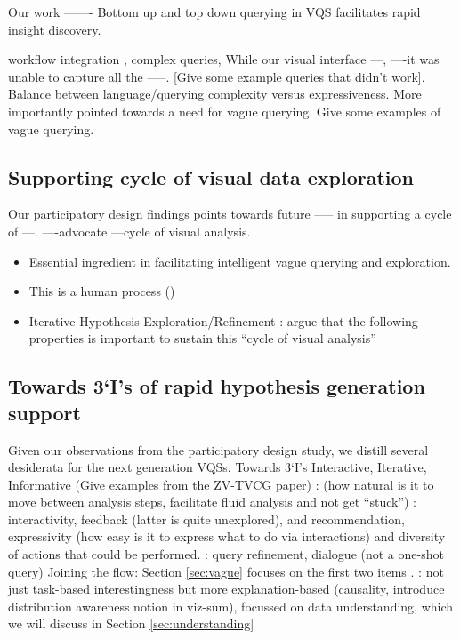 \par Our \zv work ------- Bottom up and top down querying in VQS facilitates rapid insight discovery. 

workflow integration , complex queries,
While our visual interface ---, ----it was unable to capture all the -----. [Give some example queries that didn't work]. Balance between language/querying complexity versus expressiveness. More importantly pointed towards a need for vague querying. Give some examples of vague querying.

\subsection{Supporting cycle of visual data exploration}
Our participatory design findings points towards future ----- in supporting a cycle of ---.  ----advocate ---cycle of visual analysis. 
\begin{itemize}
	\item Essential ingredient in facilitating intelligent vague querying and exploration.
	\item This is a human process (\cite{Heer2012,Pirolli})
	\item Iterative Hypothesis Exploration/Refinement : argue that the following properties is important to sustain this “cycle of visual analysis” 
\end{itemize}

\subsection{Towards 3‘I’s of rapid hypothesis generation support}
Given our observations from the participatory design study, we distill several desiderata for the next generation VQSs. 
Towards 3‘I’s Interactive, Iterative, Informative (Give examples from the ZV-TVCG paper)
:
 (how natural is it to move between analysis steps, facilitate fluid analysis and not get ``stuck'') : interactivity, feedback (latter is quite unexplored), and recommendation, expressivity (how easy is it to express what to do via interactions) and diversity of actions that could be performed.
: query refinement, dialogue (not a one-shot query)
Joining the flow: Section \ref{sec:vague} focuses on the first two items .
: not just task-based interestingness but more explanation-based (causality, introduce distribution awareness notion in viz-sum), focussed on data understanding, which we will discuss in Section \ref{sec:understanding}


